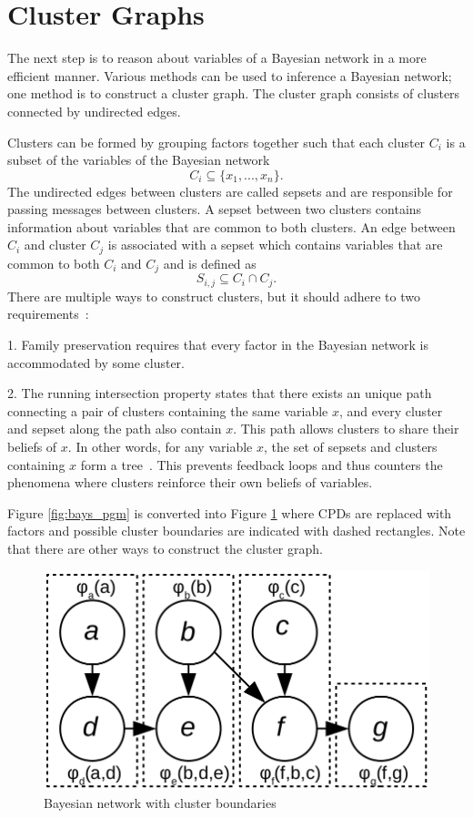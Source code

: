 \documentclass[12pt,oneside,openany,a4paper, %
afrikaans,english,
]{memoir}
\numberwithin{equation}{chapter}
\begin{document}
\section{Cluster Graphs}
The next step is to reason about variables of a Bayesian network in a more efficient manner. Various methods can be used to inference a Bayesian network; one method is to construct a cluster graph. The cluster graph consists of clusters connected by undirected edges.

Clusters can be formed by grouping factors together such that each cluster $C_i$ is a subset of the variables of the Bayesian network
\begin{equation}
C_i \subseteq \{x_1, ..., x_n\}.
\end{equation}
The undirected edges between clusters are called sepsets and are responsible for passing messages between clusters. A sepset between two clusters contains information about variables that are common to both clusters. An edge between $C_i$ and cluster $C_j$ is associated with a sepset which contains variables that are common to both $C_i$ and $C_j$ and is defined as
\begin{equation}
S_{i,j} \subseteq C_i \cap C_j.
\end{equation}
There are multiple ways to construct clusters, but it should adhere to two requirements~\citep{koller}:

1. Family preservation requires that every factor in the Bayesian network is accommodated by some cluster.

2. The running intersection property states that there exists an unique path connecting a pair of clusters containing the same variable $x$, and every cluster and sepset along the path also contain $x$. This path allows clusters to share their beliefs of $x$. In other words, for any variable $x$, the set of sepsets and clusters containing $x$ form a tree~\citep{koller}. This prevents feedback loops and thus counters the phenomena where clusters reinforce their own beliefs of variables.

Figure \ref{fig:bays_pgm} is converted into Figure \ref{fig:cluster_bound} where CPDs are replaced with factors and possible cluster boundaries are indicated with dashed rectangles. Note that there are other ways to construct the cluster graph.
\begin{figure}[H]
  \includegraphics[width=0.6\linewidth]{Figures/cluster_divisions.png}
  \centering
  \caption{Bayesian network with cluster boundaries}
  \label{fig:cluster_bound}
\end{figure}
\end{document}
